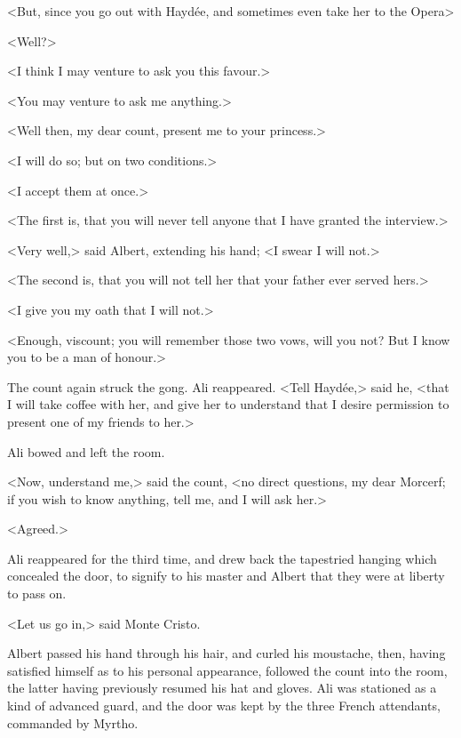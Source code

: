  <But, since you go out with Haydée, and sometimes even take her to the Opera\longdash> 

 <Well?> 

 <I think I may venture to ask you this favour.> 

 <You may venture to ask me anything.> 

 <Well then, my dear count, present me to your princess.> 

 <I will do so; but on two conditions.> 

 <I accept them at once.> 

 <The first is, that you will never tell anyone that I have granted the interview.> 

 <Very well,> said Albert, extending his hand; <I swear I will not.> 

 <The second is, that you will not tell her that your father ever served hers.> 

 <I give you my oath that I will not.> 

 <Enough, viscount; you will remember those two vows, will you not? But I know you to be a man of honour.> 

 The count again struck the gong. Ali reappeared. <Tell Haydée,> said he, <that I will take coffee with her, and give her to understand that I desire permission to present one of my friends to her.> 

 Ali bowed and left the room. 

 <Now, understand me,> said the count, <no direct questions, my dear Morcerf; if you wish to know anything, tell me, and I will ask her.> 

 <Agreed.> 

 Ali reappeared for the third time, and drew back the tapestried hanging which concealed the door, to signify to his master and Albert that they were at liberty to pass on. 

 <Let us go in,> said Monte Cristo. 

 Albert passed his hand through his hair, and curled his moustache, then, having satisfied himself as to his personal appearance, followed the count into the room, the latter having previously resumed his hat and gloves. Ali was stationed as a kind of advanced guard, and the door was kept by the three French attendants, commanded by Myrtho. 

